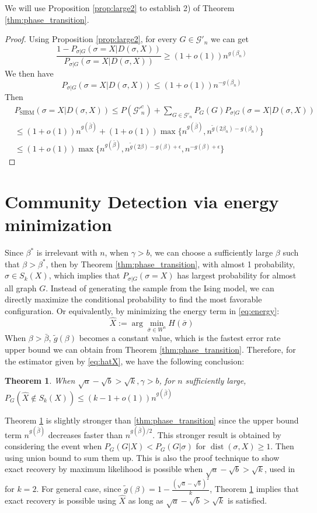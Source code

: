 \documentclass[journal]{IEEEtran}
\newtheorem{theorem}{Theorem}
\newcommand{\cG}{\mathcal{G}}
\newcommand{\1}{\mathbbm{1}}
\DeclareMathOperator{\SIBM}{SIBM}
\DeclareMathOperator{\dist}{dist}
\begin{document}
We will use Proposition \ref{prop:large2} to establish 2) of Theorem \ref{thm:phase_transition}.
\begin{proof}
	Using Proposition \ref{prop:large2}, for every $G \in \cG'_n$
	we can get
	$$
	\frac{1-P_{\sigma | G}(\sigma=X | D(\sigma, X))}{P_{\sigma | G}(\sigma=X | D(\sigma, X))}\geq (1+o(1))n^{g(\beta_n)}
	$$
	We then have
	$$
	P_{\sigma | G}(\sigma=X| D(\sigma, X)) \leq (1+o(1)) n^{-g(\beta_n)}
	$$
	Then
	\begin{align*}
	&P_{\SIBM}(\sigma=X| D(\sigma, X))  \leq P(\cG'^c_n) + \sum_{G\in \cG'_n}P_G(G) P_{\sigma|G}(\sigma=X| D(\sigma, X))\\
	& \leq (1+o(1))n^{g(\bar{\beta})} + (1+o(1)) \max\{n^{g(\bar{\beta})}, n^{\tilde{g}(2\beta_n) - g(\beta_n)} \}\\
	& \leq (1+o(1)) \max\{n^{g(\bar{\beta})}, n^{\tilde{g}(2\beta) - g(\beta) + \epsilon}, n^{-g(\beta) + \epsilon}  \}
	\end{align*}
\end{proof}
\section{Community Detection via energy minimization}
Since $\beta^*$ is irrelevant with $n$, when $\gamma>b$, we can choose a sufficiently large $\beta$ such that
$\beta > \beta^*$, then by Theorem \ref{thm:phase_transition}, with almost 1 probability, $\sigma \in S_k(X)$, which
implies that $P_{\sigma | G}(\sigma = X)$ has largest probability for almost all graph $G$. Instead of generating
the sample from the Ising model, we can directly maximize the conditional probability to find the most favorable
configuration. Or equivalently, by minimizing the energy term in \eqref{eq:energy}:
\begin{equation}\label{eq:hatX}
\hat{X} := \arg\min_{\bar{\sigma} \in W^n} H(\bar{\sigma})
\end{equation}
When $\beta > \bar{\beta}$, $\tilde{g}(\beta)$ becomes a constant value, which is the fastest error rate upper bound we can obtain
from Theorem \ref{thm:phase_transition}. Therefore, for the estimator given by \eqref{eq:hatX}, we have the following
conclusion:
\begin{theorem}\label{thm:error_rate}
When $\sqrt{a} - \sqrt{b} > \sqrt{k}, \gamma > b$, for $n$ sufficiently large, $P_G(\hat{X} \not\in S_k(X)) \leq (k-1+o(1))n^{g(\bar{\beta})}$
\end{theorem}
Theorem \ref{thm:error_rate} is slightly stronger than \ref{thm:phase_transition} since the upper bound term
$n^{g(\bar{\beta})}$ decreases
faster than $n^{g(\bar{\beta})/2}$. This stronger result is obtained by considering the event when $P_G(G | X) < P_G(G | \sigma)$
for $\dist(\sigma, X) \geq 1$. Then using union bound to sum them up. This is also the proof technique to show exact recovery by maximum likelihood is possible
when $\sqrt{a} - \sqrt{b} > \sqrt{k}$, used in \cite{abbe2015exact} for $k=2$. For general case, since $\tilde{g}(\beta) = 1- \frac{(\sqrt{a} - \sqrt{b})^2}{k}$, Theorem \ref{thm:error_rate} implies that exact recovery is possible using $\hat{X}$ as long as  
$\sqrt{a} - \sqrt{b} > \sqrt{k}$ is satisfied.
\end{document}
